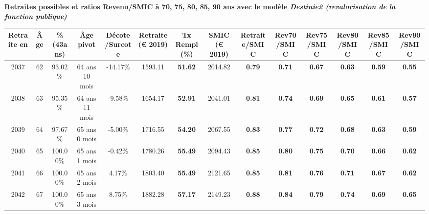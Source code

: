  \vspace{0.1cm} 
{\bf \noindent Retraites possibles et ratios Revenu/SMIC à 70, 75, 80, 85, 90 ans avec le modèle \emph{Destinie2 (revalorisation de la fonction publique)}}  
 
\begin{adjustbox}{max width=\textwidth} 
\begin{tabular}[htb]{|c|c||c|c|c||c|c||c||c|c|c|c|c|c|} 
\hline 
 Retraite en &  Âge &  \%(43ans) &  Âge pivot &  Décote/Surcote &  Retraite (\euro{} 2019) &  Tx Rempl(\%) &  SMIC (\euro{} 2019) &  Retraite/SMIC &  Rev70/SMIC &  Rev75/SMIC &  Rev80/SMIC &  Rev85/SMIC &  Rev90/SMIC \\ 
\hline \hline 
 2037 &  62 &  93.02\% &  64 ans 10 mois &  -14.17\% &  1593.11 &  {\bf 51.62} &  2014.82 &  {\bf {\color{red} 0.79}} &  {\bf {\color{red} 0.71}} &  {\bf {\color{red} 0.67}} &  {\bf {\color{red} 0.63}} &  {\bf {\color{red} 0.59}} &  {\bf {\color{red} 0.55}} \\ 
\hline 
 2038 &  63 &  95.35\% &  64 ans 11 mois &  -9.58\% &  1654.17 &  {\bf 52.91} &  2041.01 &  {\bf {\color{red} 0.81}} &  {\bf {\color{red} 0.74}} &  {\bf {\color{red} 0.69}} &  {\bf {\color{red} 0.65}} &  {\bf {\color{red} 0.61}} &  {\bf {\color{red} 0.57}} \\ 
\hline 
 2039 &  64 &  97.67\% &  65 ans 0 mois &  -5.00\% &  1716.55 &  {\bf 54.20} &  2067.55 &  {\bf {\color{red} 0.83}} &  {\bf {\color{red} 0.77}} &  {\bf {\color{red} 0.72}} &  {\bf {\color{red} 0.68}} &  {\bf {\color{red} 0.63}} &  {\bf {\color{red} 0.59}} \\ 
\hline 
 2040 &  65 &  100.00\% &  65 ans 1 mois &  -0.42\% &  1780.26 &  {\bf 55.49} &  2094.43 &  {\bf {\color{red} 0.85}} &  {\bf {\color{red} 0.80}} &  {\bf {\color{red} 0.75}} &  {\bf {\color{red} 0.70}} &  {\bf {\color{red} 0.66}} &  {\bf {\color{red} 0.62}} \\ 
\hline 
 2041 &  66 &  100.00\% &  65 ans 2 mois &  4.17\% &  1803.40 &  {\bf 55.49} &  2121.65 &  {\bf {\color{red} 0.85}} &  {\bf {\color{red} 0.81}} &  {\bf {\color{red} 0.76}} &  {\bf {\color{red} 0.71}} &  {\bf {\color{red} 0.67}} &  {\bf {\color{red} 0.62}} \\ 
\hline 
 2042 &  67 &  100.00\% &  65 ans 3 mois &  8.75\% &  1882.28 &  {\bf 57.17} &  2149.23 &  {\bf {\color{red} 0.88}} &  {\bf {\color{red} 0.84}} &  {\bf {\color{red} 0.79}} &  {\bf {\color{red} 0.74}} &  {\bf {\color{red} 0.69}} &  {\bf {\color{red} 0.65}} \\ 
\hline 
\hline 
\end{tabular} 
\end{adjustbox} 
 
